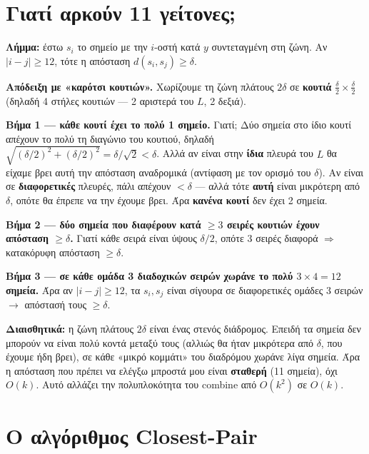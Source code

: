 \documentclass[11pt,a4paper]{article}
\begin{document}
\section{Γιατί αρκούν 11 γείτονες;}

\begin{keypoint}
\textbf{Λήμμα:} έστω $s_i$ το σημείο με την $i$-οστή κατά $y$ συντεταγμένη στη
ζώνη. Αν $|i - j| \ge 12$, τότε η απόσταση $d(s_i, s_j) \ge \delta$.
\end{keypoint}

\textbf{Απόδειξη με «καρότσι κουτιών».} Χωρίζουμε τη ζώνη πλάτους $2\delta$ σε
\textbf{κουτιά} $\frac{\delta}{2} \times \frac{\delta}{2}$ (δηλαδή 4 στήλες
κουτιών --- 2 αριστερά του $L$, 2 δεξιά).

\textbf{Βήμα 1 --- κάθε κουτί έχει το πολύ 1 σημείο.} Γιατί; Δύο σημεία στο ίδιο
κουτί απέχουν το πολύ τη διαγώνιο του κουτιού, δηλαδή $\sqrt{(\delta/2)^2 +
(\delta/2)^2} = \delta/\sqrt{2} < \delta$. Αλλά αν είναι στην \textbf{ίδια}
πλευρά του $L$ θα είχαμε βρει αυτή την απόσταση αναδρομικά (αντίφαση με τον
ορισμό του $\delta$). Αν είναι σε \textbf{διαφορετικές} πλευρές, πάλι απέχουν
$< \delta$ --- αλλά τότε \textbf{αυτή} είναι μικρότερη από $\delta$, οπότε θα
έπρεπε να την έχουμε βρει. Άρα \textbf{κανένα κουτί} δεν έχει 2 σημεία.

\textbf{Βήμα 2 --- δύο σημεία που διαφέρουν κατά $\ge 3$ σειρές κουτιών έχουν
απόσταση $\ge \delta$.} Γιατί κάθε σειρά είναι ύψους $\delta/2$, οπότε 3 σειρές
διαφορά $\Rightarrow$ κατακόρυφη απόσταση $\ge \delta$.

\textbf{Βήμα 3 --- σε κάθε ομάδα 3 διαδοχικών σειρών χωράνε το πολύ $3 \times 4 =
12$ σημεία.} Άρα αν $|i - j| \ge 12$, τα $s_i, s_j$ είναι σίγουρα σε
διαφορετικές ομάδες 3 σειρών $\to$ απόστασή τους $\ge \delta$.

\begin{intuition}
\textbf{Διαισθητικά:} η ζώνη πλάτους $2\delta$ είναι ένας στενός διάδρομος.
Επειδή τα σημεία δεν μπορούν να είναι πολύ κοντά μεταξύ τους (αλλιώς θα ήταν
μικρότερα από $\delta$, που έχουμε ήδη βρει), σε κάθε «μικρό κομμάτι» του
διαδρόμου χωράνε λίγα σημεία. Άρα η απόσταση που πρέπει να ελέγξω μπροστά μου
είναι \textbf{σταθερή} (11 σημεία), όχι $O(k)$. Αυτό αλλάζει την πολυπλοκότητα
του combine από $O(k^2)$ σε $O(k)$.
\end{intuition}

\section{Ο αλγόριθμος Closest-Pair}
\end{document}
